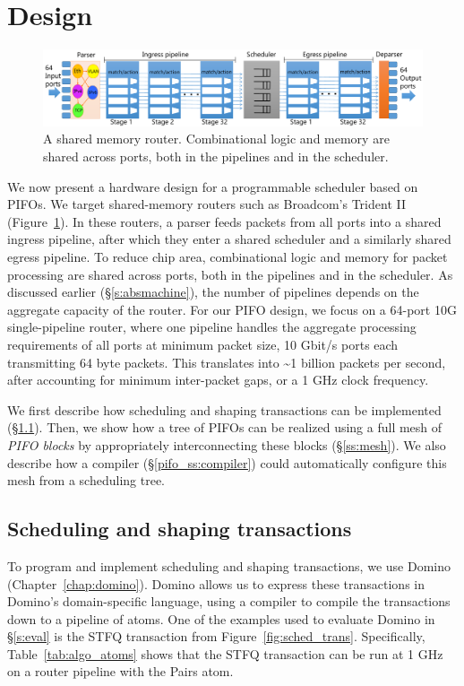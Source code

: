 \section{Design}
\label{s:design}

\begin{figure}
  \centering
  \includegraphics[width=\textwidth]{pifo_router_pipeline.pdf}
  \caption{A shared memory router.  Combinational logic and memory are
  shared across ports, both in the pipelines and in the scheduler.}
  \label{pifo_fig:router}
\end{figure}

We now present a hardware design for a programmable scheduler based on PIFOs.
We target shared-memory routers such as Broadcom's Trident II~\cite{trident2}
(Figure~\ref{pifo_fig:router}). In these routers, a parser feeds packets from
all ports into a shared ingress pipeline, after which they enter a shared
scheduler and a similarly shared egress pipeline. To reduce chip area,
combinational logic and memory for packet processing are shared across ports,
both in the pipelines and in the scheduler. As discussed earlier
(\S\ref{s:absmachine}), the number of pipelines depends on the aggregate
capacity of the router. For our PIFO design, we focus on a 64-port 10G
single-pipeline router, where one pipeline handles the aggregate processing
requirements of all ports at minimum packet size,  10 Gbit/s ports each
transmitting 64 byte packets. This translates into \textasciitilde 1 billion
packets per second, after accounting for minimum inter-packet gaps, or a 1 GHz
clock frequency.

We first describe how scheduling and shaping transactions can be implemented
(\S\ref{ss:transactions}). Then, we show how a tree of PIFOs can be realized
using a full mesh of {\em PIFO blocks} by appropriately interconnecting these blocks
(\S\ref{ss:mesh}). We also describe how a compiler (\S\ref{pifo_ss:compiler}) could
automatically configure this mesh from a scheduling tree.

\subsection{Scheduling and shaping transactions}
\label{ss:transactions}
To program and implement scheduling and shaping transactions, we use Domino
(Chapter~\ref{chap:domino}). Domino allows us to express these transactions in
Domino's domain-specific language, using a compiler to compile the transactions
down to a pipeline of \absmachine atoms.  One of the examples used to evaluate
Domino in \S\ref{s:eval} is the STFQ transaction from
Figure~\ref{fig:sched_trans}.  Specifically, Table~\ref{tab:algo_atoms} shows that
the STFQ transaction can be run at 1 GHz on a router pipeline with the Pairs
atom.

